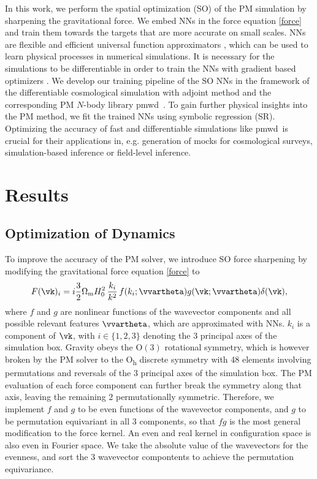 \documentclass[modern, trackchanges, dvipsnames]{aastex631}
\newcommand{\pmwd}{{\usefont{T1}{nova}{m}{sl}pmwd}}
\newcommand{\Omegam}{\Omega_\mathrm{m}}
\begin{document}
In this work, we perform the spatial optimization (SO) of the PM
simulation by sharpening the gravitational force.
We embed NNs in the force equation \eqref{force} and train them towards
the targets that are more accurate on small scales.
NNs are flexible and efficient universal function approximators
\citep{Hornik1989}, which can be used to learn physical processes in
numerical simulations.
It is necessary for the simulations to be differentiable in order to
train the NNs with gradient based optimizers \citep[e.g.][]{Adam}.
We develop our training pipeline of the SO NNs in the framework of
the differentiable cosmological simulation with adjoint method
\citep{Li2022a} and the corresponding PM $N$-body library \pmwd\
\citep{Li2022b}.
To gain further physical insights into the PM method, we fit the trained
NNs using symbolic regression (SR).
Optimizing the accuracy of fast and differentiable simulations like
\pmwd\ is crucial for their applications in, e.g. generation of mocks
for cosmological surveys, simulation-based inference or field-level
inference.



\vspace{1em}
\section{Results}

\subsection{Optimization of Dynamics}

To improve the accuracy of the PM solver, we introduce SO force
sharpening by modifying the gravitational force equation \eqref{force}
to
%
\begin{equation}
F(\vk)_i = i \frac32 \Omegam H_0^2 \,\frac{k_i}{k^2}\,
                    f(k_i; \vvartheta) g(\vk; \vvartheta) \delta(\vk),
\end{equation}
%
where $f$ and $g$ are nonlinear functions of the wavevector components
and all possible relevant features $\vvartheta$, which are approximated
with NNs.
$k_i$ is a component of $\vk$, with $i\in\{1,2,3\}$ denoting the 3
principal axes of the simulation box.
Gravity obeys the $\mathrm{O}(3)$ rotational symmetry, which is however
broken by the PM solver to the O\textsubscript{h} discrete symmetry with
48 elements involving permutations and reversals of the 3 principal axes
of the simulation box.
The PM evaluation of each force component can further break the symmetry
along that axis, leaving the remaining 2 permutationally symmetric.
Therefore, we implement $f$ and $g$ to be even functions of the
wavevector components, and $g$ to be permutation equivariant in all 3
components, so that $f g$ is the most general modification to the force
kernel.
An even and real kernel in configuration space is also even in Fourier
space.
We take the absolute value of the wavevectors for the evenness, and sort
the 3 wavevector compontents to achieve the permutation equivariance.
\end{document}
